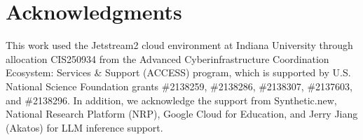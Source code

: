 \section*{Acknowledgments}
This work used the Jetstream2 cloud environment at Indiana University through allocation CIS250934 from the Advanced Cyberinfrastructure Coordination Ecosystem: Services \& Support (ACCESS) program, which is supported by U.S. National Science Foundation grants \#2138259, \#2138286, \#2138307, \#2137603, and \#2138296. In addition, we acknowledge the support from Synthetic.new, National Research Platform (NRP), Google Cloud for Education, and Jerry Jiang (Akatos) for LLM inference support.
